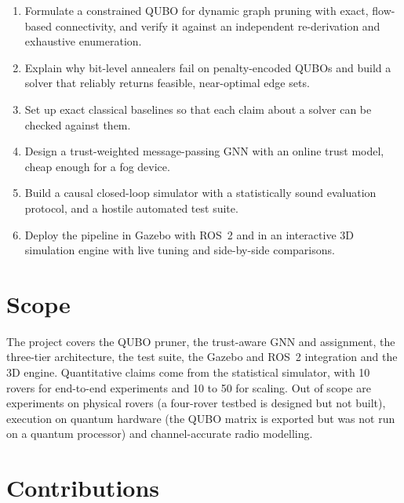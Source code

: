 \begin{enumerate}[label=\arabic*.]
\item Formulate a constrained QUBO for dynamic graph pruning with exact,
flow-based connectivity, and verify it against an independent re-derivation
and exhaustive enumeration.
\item Explain why bit-level annealers fail on penalty-encoded QUBOs and build a
solver that reliably returns feasible, near-optimal edge sets.
\item Set up exact classical baselines so that each claim about a solver can
be checked against them.
\item Design a trust-weighted message-passing GNN with an online trust model,
cheap enough for a fog device.
\item Build a causal closed-loop simulator with a statistically sound
evaluation protocol, and a hostile automated test suite.
\item Deploy the pipeline in Gazebo with ROS~2 and in an interactive 3D
simulation engine with live tuning and side-by-side comparisons.
\end{enumerate}

\section{Scope}

The project covers the QUBO pruner, the trust-aware GNN and assignment, the
three-tier architecture, the test suite, the Gazebo and ROS~2 integration and
the 3D engine. Quantitative claims come from the statistical simulator, with
10 rovers for end-to-end experiments and 10 to 50 for scaling. Out of scope
are experiments on physical rovers (a four-rover testbed is designed but not
built), execution on quantum hardware (the QUBO matrix is exported but was not
run on a quantum processor) and channel-accurate radio modelling.

\section{Contributions}

